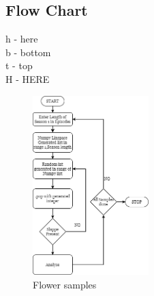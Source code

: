 \subsection{Flow Chart}
h - here \\
b - bottom \\
t - top \\
H - HERE 
\begin{figure}[hbt]
    \centering
    \includegraphics[width=0.4\textwidth,frame]{Assets/RandoFlowchart.png}
    \caption{Flower samples}
    \label{fig:That one flowchart I have}
\end{figure}
